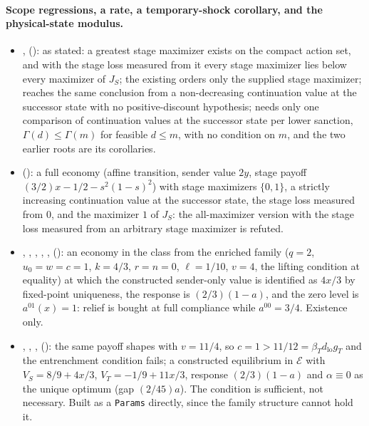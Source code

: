 \paragraph{Scope regressions, a rate, a temporary-shock corollary, and the physical-state
modulus.}
\begin{itemize}[leftmargin=1.4em,itemsep=1pt]
\item {},  ():  as stated: a greatest stage maximizer exists on the compact action set, and with the stage loss measured from it every stage maximizer lies below every maximizer of $J_S$; the existing  orders only the supplied stage maximizer;  reaches the same conclusion from a non-decreasing continuation value at the successor state with no positive-discount hypothesis;  needs only one comparison of continuation values at the successor state per lower sanction, $\Gamma(d)\le\Gamma(m)$ for feasible $d\le m$, with no condition on $m$, and the two earlier roots are its corollaries.
\item {} (): a full economy (affine transition, sender value $2y$, stage payoff $(3/2)x-1/2-s^2(1-s)^2$) with stage maximizers $\{0,1\}$, a strictly increasing continuation value at the successor state, the stage loss measured from $0$, and the maximizer $1$ of $J_S$: the all-maximizer version with the stage loss measured from an arbitrary stage maximizer is refuted.
\item {}, , , , ,  (): an economy in the class from the enriched family ($q=2$, $u_0=w=c=1$, $k=4/3$, $r=n=0$, $\ell=1/10$, $v=4$, the lifting condition at equality) at which the constructed sender-only value is identified as $4x/3$ by fixed-point uniqueness, the response is $(2/3)(1-a)$, and the zero level is $a^{01}(x)=1$: relief is bought at full compliance while $a^{00}=3/4$. Existence only.
\item {}, , ,  (): the same payoff shapes with $v=11/4$, so $c=1>11/12=\beta_Td_{\mathrm{lo}}g_T$ and the entrenchment condition fails; a constructed equilibrium in $\mathcal E$ with $V_S=8/9+4x/3$, $V_T=-1/9+11x/3$, response $(2/3)(1-a)$ and $\alpha\equiv0$ as the unique optimum (gap $(2/45)a$). The condition is sufficient, not necessary. Built as a \texttt{Params} directly, since the family structure cannot hold it.

\end{itemize}
